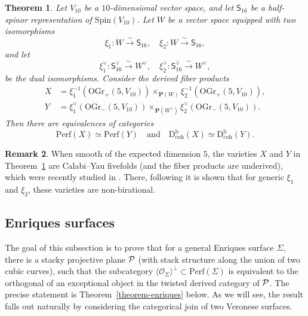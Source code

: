 \documentclass[11pt, reqno]{amsart}
\numberwithin{equation}{section}
\theoremstyle{plain}
\newtheorem{theorem}{Theorem}[section]
\theoremstyle{definition}
\newtheorem{remark}[theorem]{Remark}
\newcommand{\Perf}{\mathrm{Perf}}
\newcommand{\Db}{\mathrm{D^b_{coh}}}
\newcommand{\svee}{\scriptscriptstyle\vee}
\newcommand{\OGrp}{\mathrm{OGr_+}}
\newcommand{\OGrm}{\mathrm{OGr_-}}
\newcommand{\Spin}{\mathrm{Spin}}
\newcommand{\cO}{\mathcal{O}}
\newcommand{\ccP}{\CMcal{P}}
\newcommand{\bP}{\mathbf{P}}
\newcommand{\sSs}{\mathsf{S}_{16}}
\begin{document}
\begin{theorem}
\label{theorem-OGr-intersection} 
Let $V_{10}$ be a $10$-dimensional vector space, and let $\sSs$ be a 
half-spinor representation of $\Spin(V_{10})$. 
Let $W$ be a vector space equipped with two isomorphisms 
\begin{equation*}
\xi_1 \colon W \xrightarrow{\sim} \sSs , \quad 
\xi_2 \colon W \xrightarrow{\sim} \sSs ,  
\end{equation*}
and let  
\begin{equation*}
\xi_1^{\svee} \colon  \sSs^{\svee} \xrightarrow{\sim} W^{\svee} , \quad 
\xi_2^{\svee} \colon \sSs^{\svee} \xrightarrow{\sim} W^{\svee},  
\end{equation*}
be the dual isomorphisms. 
Consider the derived fiber products
\begin{align*}
X & = \xi_1^{-1}(\OGrp(5,V_{10})) \times_{\bP(W)} \xi_{2}^{-1}(\OGrp(5,V_{10}))  , \\ 
Y & = \xi_1^{\svee}(\OGrm(5,V_{10})) \times_{\bP(W^{\svee})} \xi_{2}^{\svee}(\OGrm(5,V_{10})) . 
\end{align*}
Then there are equivalences of categories 
\begin{equation*}
\Perf(X) \simeq \Perf(Y) \quad \text{and} \quad \Db(X) \simeq \Db(Y). 
\end{equation*}
\end{theorem}

\begin{remark}
When smooth of the expected dimension $5$, the varieties $X$ and $Y$ 
in Theorem~\ref{theorem-OGr-intersection} are Calabi--Yau fivefolds 
(and the fiber products are underived), which were 
recently studied in \cite{double-spinor}. There, following \cite{GPK3, jj-torelli} 
it is shown that for generic $\xi_1$ and $\xi_2$, these varieties are non-birational.   
\end{remark}

\subsection{Enriques surfaces}
\label{subsection-Enriques} 
The goal of this subsection is to prove that for a general Enriques surface $\Sigma$, 
there is a stacky projective plane $\ccP$ (with stack structure 
along the union of two cubic curves), such that the subcategory $\langle \cO_\Sigma \rangle^{\perp} \subset \Perf(\Sigma)$ 
is equivalent to the orthogonal of an exceptional object in the twisted derived category of $\ccP$.  
The precise statement is Theorem~\ref{theorem-enriques} below. 
As we will see, the result falls out naturally by considering the categorical join of two Veronese surfaces. 
\end{document}

